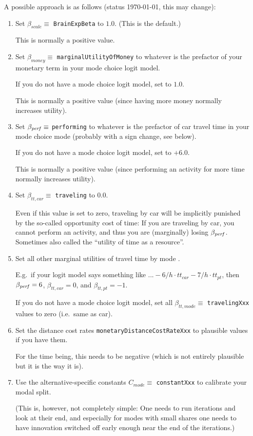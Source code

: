 A possible approach is as follows (status \today, this may change):
\begin{enumerate}

\item Set $\beta_{scale} \equiv$ \verb$BrainExpBeta$ to $1.0$.  (This is the default.)

This is normally a positive value.

\item Set $\beta_{money} \equiv$ \verb$marginalUtilityOfMoney$ to whatever is the prefactor of your monetary term in your mode choice logit model.

If you do not have a mode choice logit model, set to $1.0$. 

This is normally a positive value (since having more money normally increases utility).

\item Set $\beta_{\it perf} \equiv$ \verb$performing$ to whatever is the prefactor of car travel time in your mode choice mode (probably with a sign change, see below).

If you do not have a mode choice logit model, set to $+6.0$.

This is normally a positive value (since performing an activity for more time normally increases utility).

\item Set $\beta_{tt,car} \equiv$ \verb$traveling$ to $0.0$.

  Even if this value is set to zero, traveling by car will be implicitly punished by the so-called opportunity cost of time: If you are traveling by car, you cannot perform an activity, and thus you are (marginally) losing $\beta_{\it perf}$.  Sometimes also called the ``utility of time as a resource''.

\item Set all other marginal utilities of travel time by mode .

E.g.\ if your logit model says something like $... -6/h \cdot tt_{car} - 7/h \cdot tt_{pt}$, then $\beta_{\it perf} = 6$, $\beta_{tt,car} = 0$, and $\beta_{tt,pt} = -1$.

If you do not have a mode choice logit model, set all $\beta_{tt,mode} \equiv$ \verb$travelingXxx$ values to zero (i.e.\ same as car).

\item Set the distance cost rates \verb$monetaryDistanceCostRateXxx$ to plausible values if you have them.

For the time being, this needs to be negative (which is not entirely plausible but it is the way it is).

\item Use the alternative-specific constants $C_{mode} \equiv$ \verb$constantXxx$ to calibrate your modal split.

(This is, however, not completely simple: One needs to run iterations and look at their end, and especially for modes with small shares one needs to have innovation switched off early enough near the end of the iterations.)

\end{enumerate}

